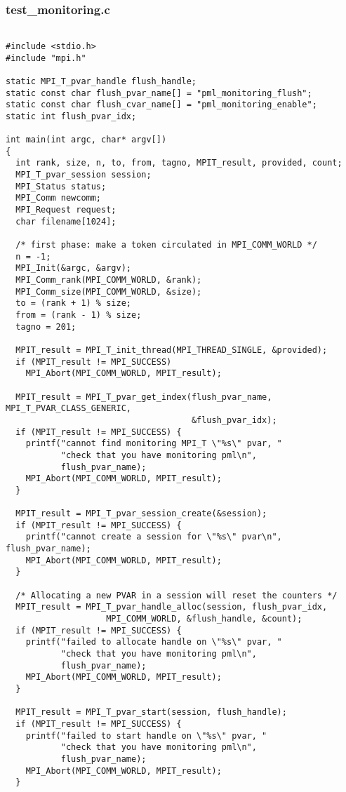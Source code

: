 \documentclass[notitlepage]{article}
\begin{document}
\subsubsection{test\_monitoring.c}

\begin{verbatim}
  
#include <stdio.h>
#include "mpi.h"

static MPI_T_pvar_handle flush_handle;
static const char flush_pvar_name[] = "pml_monitoring_flush";
static const char flush_cvar_name[] = "pml_monitoring_enable";
static int flush_pvar_idx;

int main(int argc, char* argv[])
{
  int rank, size, n, to, from, tagno, MPIT_result, provided, count;
  MPI_T_pvar_session session;
  MPI_Status status;
  MPI_Comm newcomm;
  MPI_Request request;
  char filename[1024];

  /* first phase: make a token circulated in MPI_COMM_WORLD */
  n = -1;
  MPI_Init(&argc, &argv);
  MPI_Comm_rank(MPI_COMM_WORLD, &rank);
  MPI_Comm_size(MPI_COMM_WORLD, &size);
  to = (rank + 1) % size;
  from = (rank - 1) % size;
  tagno = 201;

  MPIT_result = MPI_T_init_thread(MPI_THREAD_SINGLE, &provided);
  if (MPIT_result != MPI_SUCCESS)
    MPI_Abort(MPI_COMM_WORLD, MPIT_result);

  MPIT_result = MPI_T_pvar_get_index(flush_pvar_name, MPI_T_PVAR_CLASS_GENERIC, 
                                     &flush_pvar_idx);
  if (MPIT_result != MPI_SUCCESS) {
    printf("cannot find monitoring MPI_T \"%s\" pvar, "
           "check that you have monitoring pml\n",
           flush_pvar_name);
    MPI_Abort(MPI_COMM_WORLD, MPIT_result);
  }

  MPIT_result = MPI_T_pvar_session_create(&session);
  if (MPIT_result != MPI_SUCCESS) {
    printf("cannot create a session for \"%s\" pvar\n", flush_pvar_name);
    MPI_Abort(MPI_COMM_WORLD, MPIT_result);
  }

  /* Allocating a new PVAR in a session will reset the counters */
  MPIT_result = MPI_T_pvar_handle_alloc(session, flush_pvar_idx,
					MPI_COMM_WORLD, &flush_handle, &count);
  if (MPIT_result != MPI_SUCCESS) {
    printf("failed to allocate handle on \"%s\" pvar, "
           "check that you have monitoring pml\n",
           flush_pvar_name);
    MPI_Abort(MPI_COMM_WORLD, MPIT_result);
  }

  MPIT_result = MPI_T_pvar_start(session, flush_handle);
  if (MPIT_result != MPI_SUCCESS) {
    printf("failed to start handle on \"%s\" pvar, "
           "check that you have monitoring pml\n",
           flush_pvar_name);
    MPI_Abort(MPI_COMM_WORLD, MPIT_result);
  }


\end{verbatim}
\end{document}

